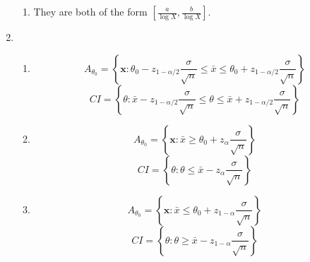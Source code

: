 \documentclass{article}
\begin{document}
\begin{enumerate}[leftmargin = 0 em, label = \arabic*., font = \bfseries]
\begin{enumerate}
	\item 
	They are both of the form $[\frac{a}{\log X}, \frac{b}{\log X}]$.
	\end{enumerate}
	\item 
	\begin{enumerate}
		\item 
		\[A_{\theta_0} = \left\{\bm x : \theta_0 - z_{1 - \alpha/2} \frac{\sigma}{\sqrt{n}} \leq \bar{x} \leq \theta_0 + z_{1 - \alpha/2} \frac{\sigma}{\sqrt{n}}\right\}\]
		\[ CI = \left\{\theta: \bar{x} - z_{1 - \alpha/2} \frac{\sigma}{\sqrt{n}} \leq \theta \leq \bar{x} + z_{1 - \alpha/2} \frac{\sigma}{\sqrt{n}}\right\} \]
		\item 
		\[A_{\theta_0} = \left\{\bm x : \bar{x} \geq \theta_0 + z_{\alpha} \frac{\sigma}{\sqrt{n}}\right\}\]
		\[ CI = \left\{\theta:  \theta \leq \bar{x} - z_{\alpha} \frac{\sigma}{\sqrt{n}}\right\} \]
		\item 
		\[A_{\theta_0} = \left\{\bm x : \bar{x} \leq \theta_0 + z_{1 - \alpha} \frac{\sigma}{\sqrt{n}}\right\}\]
		\[ CI = \left\{\theta:  \theta \geq \bar{x} - z_{1 - \alpha} \frac{\sigma}{\sqrt{n}}\right\} \]
	\end{enumerate}
	



\end{enumerate}
\end{document}
